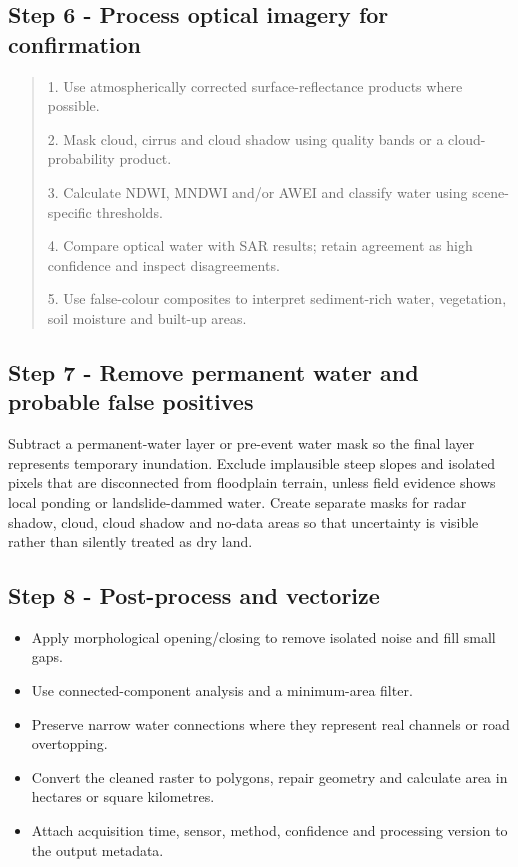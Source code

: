 \documentclass[11pt,a4paper]{article}
\begin{document}
\subsection{Step 6 - Process optical imagery for confirmation}\label{step-6---process-optical-imagery-for-confirmation}

\begin{quote}
1. Use atmospherically corrected surface-reflectance products where possible.

2. Mask cloud, cirrus and cloud shadow using quality bands or a cloud-probability product.

3. Calculate NDWI, MNDWI and/or AWEI and classify water using scene-specific thresholds.

4. Compare optical water with SAR results; retain agreement as high confidence and inspect disagreements.

5. Use false-colour composites to interpret sediment-rich water, vegetation, soil moisture and built-up areas.
\end{quote}

\subsection{Step 7 - Remove permanent water and probable false positives}\label{step-7---remove-permanent-water-and-probable-false-positives}

Subtract a permanent-water layer or pre-event water mask so the final layer represents temporary inundation. Exclude implausible steep slopes and isolated pixels that are disconnected from floodplain terrain, unless field evidence shows local ponding or landslide-dammed water. Create separate masks for radar shadow, cloud, cloud shadow and no-data areas so that uncertainty is visible rather than silently treated as dry land.

\subsection{Step 8 - Post-process and vectorize}\label{step-8---post-process-and-vectorize}

\begin{itemize}
\item
  Apply morphological opening/closing to remove isolated noise and fill small gaps.
\item
  Use connected-component analysis and a minimum-area filter.
\item
  Preserve narrow water connections where they represent real channels or road overtopping.
\item
  Convert the cleaned raster to polygons, repair geometry and calculate area in hectares or square kilometres.
\item
  Attach acquisition time, sensor, method, confidence and processing version to the output metadata.
\end{itemize}
\end{document}
